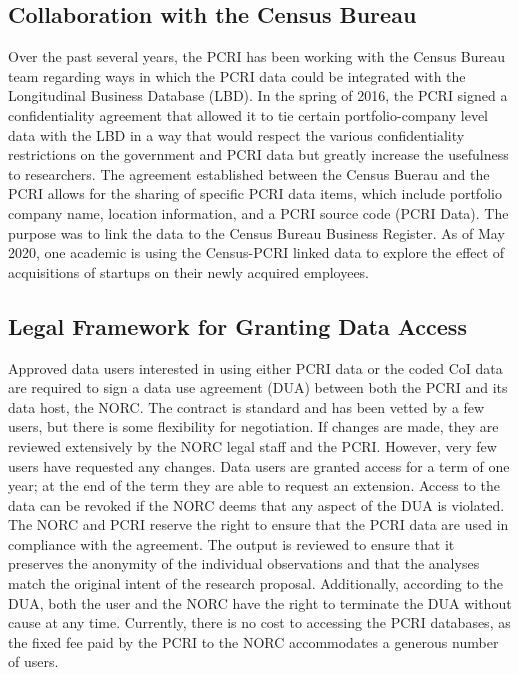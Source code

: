 \hypertarget{collaboration-with-the-census-bureau}{%
\subsection{Collaboration with the Census Bureau}\label{collaboration-with-the-census-bureau}}

Over the past several years, the PCRI has been working with the Census Bureau team regarding ways in which the PCRI data could be integrated with the Longitudinal Business Database (LBD). In the spring of 2016, the PCRI signed a confidentiality agreement that allowed it to tie certain portfolio-company level data with the LBD in a way that would respect the various confidentiality restrictions on the government and PCRI data but greatly increase the usefulness to researchers. The agreement established between the Census Buerau and the PCRI allows for the sharing of specific PCRI data items, which include portfolio company name, location information, and a PCRI source code (PCRI Data). The purpose was to link the data to the Census Bureau Business Register. As of May 2020, one academic is using the Census-PCRI linked data to explore the effect of acquisitions of startups on their newly acquired employees.

\hypertarget{legal-framework-for-granting-data-access-2}{%
\subsection{Legal Framework for Granting Data Access}\label{legal-framework-for-granting-data-access-2}}

Approved data users interested in using either PCRI data or the coded CoI data are required to sign a data use agreement (DUA) between both the PCRI and its data host, the NORC. The contract is standard and has been vetted by a few users, but there is some flexibility for negotiation. If changes are made, they are reviewed extensively by the NORC legal staff and the PCRI. However, very few users have requested any changes. Data users are granted access for a term of one year; at the end of the term they are able to request an extension. Access to the data can be revoked if the NORC deems that any aspect of the DUA is violated. The NORC and PCRI reserve the right to ensure that the PCRI data are used in compliance with the agreement. The output is reviewed to ensure that it preserves the anonymity of the individual observations and that the analyses match the original intent of the research proposal. Additionally, according to the DUA, both the user and the NORC have the right to terminate the DUA without cause at any time. Currently, there is no cost to accessing the PCRI databases, as the fixed fee paid by the PCRI to the NORC accommodates a generous number of users.

